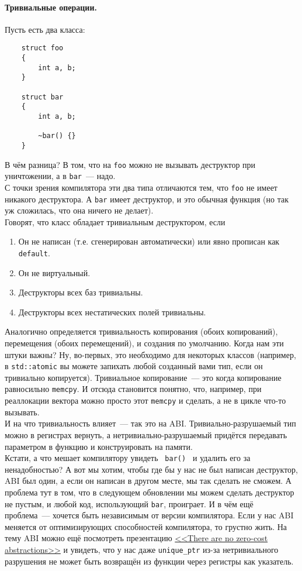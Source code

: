 \documentclass{article}
\begin{document}
    \paragraph{Тривиальные операции.}
    Пусть есть два класса:
    \begin{verbatim}
    struct foo
    {
        int a, b;
    }

    struct bar
    {
        int a, b;

        ~bar() {}
    }
    \end{verbatim}
    В чём разница? В том, что на \texttt{foo} можно не вызывать деструктор при уничтожении, а в \texttt{bar}~--- надо.\\
    С точки зрения компилятора эти два типа отличаются тем, что \texttt{foo} не имеет никакого деструктора. А \texttt{bar} имеет деструктор, и это обычная функция (но так уж сложилась, что она ничего не делает).\\
    Говорят, что класс обладает тривиальным деструктором, если
    \begin{enumerate}
        \item Он не написан (т.е. сгенерирован автоматически) или явно прописан как \texttt{default}.
        \item Он не виртуальный.
        \item Деструкторы всех баз тривиальны.
        \item Деструкторы всех нестатических полей тривиальны.
    \end{enumerate}
    Аналогично определяется тривиальность копирования (обоих копирований), перемещения (обоих перемещений), и создания по умолчанию. Когда нам эти штуки важны? Ну, во-первых, это необходимо для некоторых классов (например, в \texttt{std::atomic} вы можете запихать любой созданный вами тип, если он тривиально копируется). Тривиальное копирование~--- это когда копирование равносильно \texttt{memcpy}. И отсюда становится понятно, что, например, при реаллокации вектора можно просто этот \texttt{memcpy} и сделать, а не в цикле что-то вызывать.\\
    И на что тривиальность влияет~--- так это на ABI. Тривиально-разрушаемый тип можно в регистрах вернуть, а нетривиально-разрушаемый придётся передавать параметром в функцию и конструировать на памяти.\\
    Кстати, а что мешает компилятору увидеть \texttt{~bar() {}} и удалить его за ненадобностью? А вот мы хотим, чтобы где бы у нас не был написан деструктор, ABI был один, а если он написан в другом месте, мы так сделать не сможем. А проблема тут в том, что в следующем обновлении мы можем сделать деструктор не пустым, и любой код, использующий \texttt{bar}, проиграет. И в чём ещё проблема~--- хочется быть независимым от версии компилятора. Если у нас ABI меняется от оптимизирующих способностей компилятора, то грустно жить. На тему ABI можно ещё посмотреть презентацию \href{https://www.youtube.com/watch?v=rHIkrotSwcc}{<<There are no zero-cost abstractions>>} и увидеть, что у нас даже \texttt{unique_ptr} из-за нетривиального разрушения не может быть возвращён из функции через регистры как указатель.\\
\end{document}
